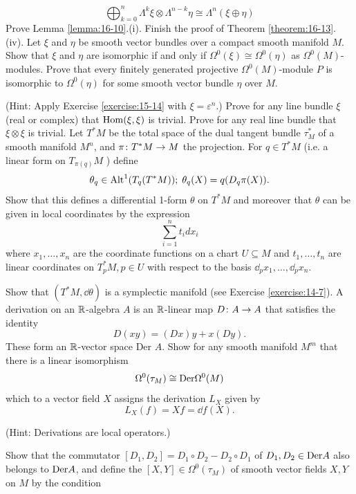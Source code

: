 \begin{enumerate}[label=\theexercise.\arabic*.,ref=\theexercise.\arabic*,leftmargin=2.7em]
    \[
      \bigoplus_{k = 0}^n{\Lambda }^{k}\xi  \otimes  {\Lambda }^{n- k}\eta  \cong  {\Lambda }^{n}( {\xi  \oplus  \eta })
    \]
  \NewItem Prove Lemma \ref{lemma:16-10}.(i).
    \NewItem Finish the proof of Theorem \ref{theorem:16-13}.(iv).
  \NewItem Let $\xi$ and $\eta$ be smooth vector bundles over a compact smooth manifold $M$. Show that $\xi$ and $\eta$ are isomorphic if and only if ${\Omega }^{0}( \xi )  \cong  {\Omega }^{0}( \eta )$ as ${\Omega }^{0}( M)$- modules. Prove that every finitely generated projective ${\Omega }^{0}( M)$-module $P$ is isomorphic to ${\Omega }^{0}( \eta )$ for some smooth vector bundle $\eta$ over $M$.
    \par(Hint: Apply Exercise \ref{exercise:15-14} with $\xi  = {\varepsilon }^{n}$.)
  \NewItem Prove for any line bundle $\xi$ (real or complex) that $\mathrm{Hom}( {\xi,\xi })$ is trivial. Prove for any real line bundle that $\xi  \otimes  \xi$ is trivial.
  \NewItem Let ${T}^*M$ be the total space of the dual tangent bundle ${\tau }_{M}^*$ of a smooth manifold ${M}^{n}$, and $\pi\colon  {T}^*M \rightarrow  M$ the projection. For $q \in  {T}^*M$ (i.e. a linear form on ${T}_{\pi ( q) }M$ ) define
    \[
      {\theta }_{q} \in  {\operatorname{Alt}}^{1}( {{T}_{q}( {{T}^*M}) });\;{\theta }_{q}( X)  = q( {{D}_{q}\pi ( X) }).
    \]
    Show that this defines a differential 1-form $\theta$ on ${T}^*M$ and moreover that $\theta$ can be given in local coordinates by the expression
    \[
      \sum_{i=1}^{n}{t}_{i}d{x}_{i}
    \]
    where ${x}_{1},\ldots,{x}_{n}$ are the coordinate functions on a chart $U \subseteq  M$ and ${t}_{1},\ldots,{t}_{n}$ are linear coordinates on ${T}_{p}^*M,p \in  U$ with respect to the basis ${\dd}_{p}{x}_{1},\ldots,{\dd}_{p}{x}_{n}$.\par
    Show that $( {{T}^*M,{\dd\theta }})$ is a symplectic manifold (see Exercise \ref{exercise:14-7}).
  \newchap[17]
  \NewItem A derivation on an $\mathbb{R}$-algebra $A$ is an $\mathbb{R}$-linear map $D\colon A \rightarrow  A$ that satisfies the identity
    \[
      D( {xy})  = ( {Dx}) y + x( {Dy}).
    \]
    These form an $\mathbb{R}$-vector space Der $A$. Show for any smooth manifold ${M}^{m}$ that there is a linear isomorphism
    \[
      {\Omega }^{0}( {\tau }_{M})  \cong  \mathrm{Der}{\Omega }^{0}( M)
    \]
    which to a vector field $X$ assigns the derivation ${L}_{X}$ given by
    \[
      {L}_{X}( f)  = {Xf} = {\dd f}( X).
    \]
    \par(Hint: Derivations are local operators.)\par
    Show that the commutator $[  {{D}_{1},{D}_{2}}]   = {D}_{1} \circ  {D}_{2}- {D}_{2} \circ  {D}_{1}$ of ${D}_{1},{D}_{2} \in  \mathrm{Der}A$ also belongs to $\mathrm{Der}A$, and define the  $[  {X,Y}]   \in  {\Omega }^{0}( {\tau }_{M})$ of smooth vector fields $X,Y$ on $M$ by the condition

\end{enumerate}
